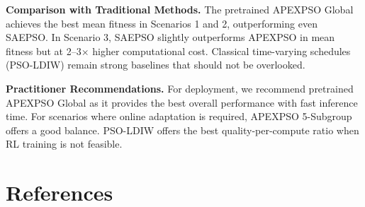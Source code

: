 \documentclass[fleqn,10pt]{wlscirep}
\begin{document}
\textbf{Comparison with Traditional Methods.} The pretrained APEXPSO Global achieves the best mean fitness in Scenarios 1 and 2, outperforming even SAEPSO.
In Scenario 3, SAEPSO slightly outperforms APEXPSO in mean fitness but at 2--3$\times$ higher computational cost.
Classical time-varying schedules (PSO-LDIW) remain strong baselines that should not be overlooked.

\textbf{Practitioner Recommendations.} For deployment, we recommend pretrained APEXPSO Global as it provides the best overall performance with fast inference time.
For scenarios where online adaptation is required, APEXPSO 5-Subgroup offers a good balance.
PSO-LDIW offers the best quality-per-compute ratio when RL training is not feasible.

\clearpage
\section*{References}
\end{document}
